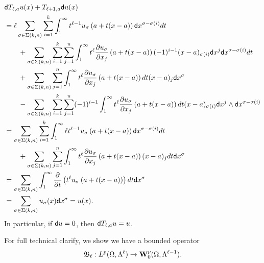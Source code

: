 \documentclass[a4paper]{article}
\begin{document}
\begin{align*}
    &
    {\mathsf d} T_{\ell,a} u(x)
    +
    T_{\ell+1,a} {\mathsf d} u(x)
    \\&
    =
    \ell
    \sum_{\sigma \in \Sigma(k,n)} \sum_{i=1}^{k}
    \int_{1}^\infty 
    t^{\ell-1} u_{\sigma}\left(a+t(x-a)\right) {\mathsf d}x^{\sigma-\sigma(i)} dt 
    \\&\qquad
    + 
    \sum_{\sigma \in \Sigma(k,n)} \sum_{i=1}^{k} \sum_{j=1}^{n}
    \int_{1}^\infty 
    t^{\ell} \frac{ \partial u_{\sigma} }{\partial x_{j}}\left(a+t(x-a)\right) (-1)^{i-1} (x-a)_{\sigma(i) } {\mathsf d}x^{j} {\mathsf d}x^{\sigma-\sigma(i)} dt 
    \\&\qquad
    +
    \sum_{\sigma \in \Sigma(k,n)} \sum_{j=1}^{n}
    \int_{1}^\infty t^{\ell} \frac{ \partial u_{\sigma} }{\partial x_{j}}\left(a+t(x-a)\right) dt (x-a)_{j}
    {\mathsf d}x^{\sigma}
    \\&\qquad
    - 
    \sum_{\sigma \in \Sigma(k,n)} \sum_{i=1}^{k} \sum_{j=1}^{n}
    (-1)^{i-1}
    \int_{1}^\infty t^{\ell} \frac{ \partial u_{\sigma} }{\partial x_{j}}\left(a+t(x-a)\right) dt 
    (x-a)_{\sigma(i)} {\mathsf d}x^{j} \wedge {\mathsf d}x^{\sigma-\sigma(i)}
    \\&
    =
    \sum_{\sigma \in \Sigma(k,n)} \sum_{i=1}^{k}
    \int_{1}^\infty 
    \ell t^{\ell-1} u_{\sigma}\left(a+t(x-a)\right) {\mathsf d}x^{\sigma-\sigma(i)} dt 
    \\&\qquad
    +
    \sum_{\sigma \in \Sigma(k,n)} \sum_{j=1}^{n}
    \int_{1}^\infty t^{\ell} \frac{ \partial u_{\sigma} }{\partial x_{j}}\left(a+t(x-a)\right) (x-a)_{j} dt
    {\mathsf d}x^{\sigma}
    \\&
    =
    \sum_{\sigma \in \Sigma(k,n)} 
    \int_{1}^\infty \frac{\partial}{\partial t} \left( t^{\ell} u_{\sigma}\left(a+t(x-a)\right) \right) dt {\mathsf d}x^{\sigma}
    \\&
    =
    \sum_{\sigma \in \Sigma(k,n)} 
    u_{\sigma}(x) {\mathsf d}x^{\sigma}
    =
    u(x)
    .
\end{align*}
In particular, if ${\mathsf d} u = 0$, then ${\mathsf d} T_{\ell,a} u = u$.



For full technical clarify, we show we have a bounded operator 
\[
    {\mathfrak B}_{\ell} : L^{p}(\Omega,\Lambda^{\ell}) \rightarrow {\mathbf W}^{p}_{0}(\Omega,\Lambda^{\ell-1})
    .
\]
\end{document}
